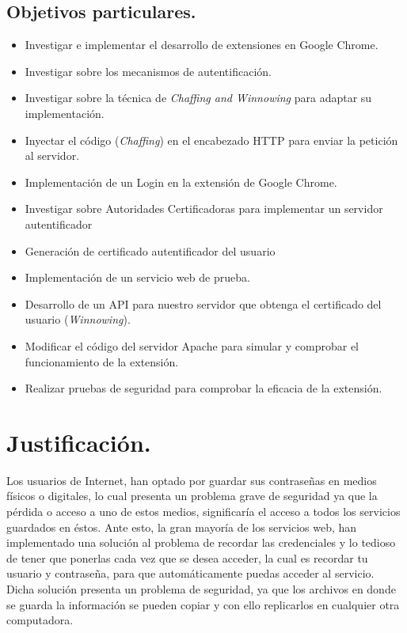 \documentclass[12pt, a4paper, titlepage]{report}
\begin{document}
		\subsection{Objetivos particulares.}
			\begin{itemize}
				\item Investigar e implementar el desarrollo de extensiones en Google Chrome.
				\item Investigar sobre los mecanismos de autentificación.
				\item Investigar sobre la técnica de \textit{Chaffing and Winnowing} para adaptar su implementación.
				\item Inyectar el código (\textit{Chaffing}) en el encabezado HTTP para enviar la petición al servidor. 
				\item Implementación de un Login en la extensión de Google Chrome.
				\item Investigar sobre Autoridades Certificadoras para implementar un servidor autentificador
				\item Generación de certificado autentificador del usuario
				\item Implementación de un servicio web de prueba.
				\item Desarrollo de un API para nuestro servidor que obtenga el certificado del usuario (\textit{Winnowing}).
				\item Modificar el código del servidor Apache para simular y comprobar el funcionamiento de la extensión. 
				\item Realizar pruebas de seguridad para comprobar la eficacia de la extensión. 
			\end{itemize}
			
	\section{Justificación.}
	    Los usuarios de Internet, han optado por guardar sus contraseñas en medios físicos o digitales, lo cual presenta un problema grave de seguridad ya que la pérdida o acceso a uno de estos medios, significaría el acceso a todos los servicios guardados en éstos. Ante esto, la gran mayoría de los servicios web, han implementado una solución al problema de recordar las credenciales y lo tedioso de tener que ponerlas cada vez que se desea acceder, la cual es recordar tu usuario y contraseña, para que automáticamente puedas acceder al servicio. Dicha solución presenta un problema de seguridad, ya que los archivos en donde se guarda la información se pueden copiar y con ello replicarlos en cualquier otra computadora.\\
	    
\end{document}

